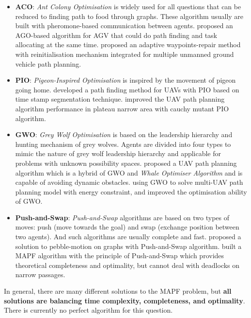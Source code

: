\documentclass[12pt, oneside]{article}
\begin{document}
\begin{itemize}
\begin{itemize}
         \item \textbf{ACO}: \textit{Ant Colony Optimisation} is widely used for all questions that can be reduced to finding path to food through graphs. These algorithm usually are built with pheromone-based communication between agents. \cite{AGO_1} proposed an AGO-based algorithm for AGV that could do path finding and task allocating at the same time.  \cite{AGO_2} proposed an adaptive waypoints-repair method with reinitialisation mechanism integrated for multiple unmanned ground vehicle path planning.
         \item \textbf{PIO}: \textit{Pigeon-Inspired Optimisation} is inspired by the movement of pigeon going home. \cite{PIO_1} developed a path finding method for UAVs with PIO based on time stamp segmentation technique. \cite{PIO_2} improved the UAV path planning algorithm performance in plateau narrow area with cauchy mutant PIO algorithm.
         \item \textbf{GWO}: \textit{Grey Wolf Optimisation}\cite{GWO} is based on the leadership hierarchy and hunting mechanism of grey wolves. Agents are divided into four types to mimic the nature of grey wolf leadership hierarchy and applicable for problems with unknown possibility spaces.\cite{GWO_1} proposed a UAV path planning algorithm which is a hybrid of GWO and \textit{Whale Optimiser Algorithm} and is capable of avoiding dynamic obstacles. \cite{GWO_2} using GWO to solve multi-UAV path planning model with energy constraint, and improved the optimisation ability of GWO.
         \item \textbf{Push-and-Swap}: \textit{Push-and-Swap} algorithms \cite{Push_and_Swap} are based on two types of moves: push (move towards the goal) and swap (exchange position between two agents). And such algorithms are usually complete and fast. \cite{PaS_1} proposed a solution to pebble-motion on graphs with Push-and-Swap algorithm. \cite{PaS_2} built a MAPF algorithm with the principle of Push-and-Swap which provides theoretical completeness and optimality, but cannot deal with deadlocks on narrow passages.
     \end{itemize}
\end{itemize}

In general, there are many different solutions to the MAPF problem, but \textbf{all solutions are balancing time complexity, completeness, and optimality}. There is currently no perfect algorithm for this question.
\end{document}
